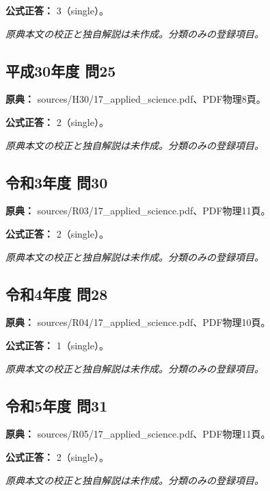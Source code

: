 \textbf{公式正答：} 3（single）。

\par\textit{原典本文の校正と独自解説は未作成。分類のみの登録項目。}

\subsection{平成30年度 問25}
\label{q:h30-reg-applied-25}

\noindent\textbf{原典：} sources/H30/17\_applied\_science.pdf、PDF物理8頁。

\textbf{公式正答：} 2（single）。

\par\textit{原典本文の校正と独自解説は未作成。分類のみの登録項目。}

\subsection{令和3年度 問30}
\label{q:r03-reg-applied-30}

\noindent\textbf{原典：} sources/R03/17\_applied\_science.pdf、PDF物理11頁。

\textbf{公式正答：} 2（single）。

\par\textit{原典本文の校正と独自解説は未作成。分類のみの登録項目。}

\subsection{令和4年度 問28}
\label{q:r04-reg-applied-28}

\noindent\textbf{原典：} sources/R04/17\_applied\_science.pdf、PDF物理10頁。

\textbf{公式正答：} 1（single）。

\par\textit{原典本文の校正と独自解説は未作成。分類のみの登録項目。}

\subsection{令和5年度 問31}
\label{q:r05-reg-applied-31}

\noindent\textbf{原典：} sources/R05/17\_applied\_science.pdf、PDF物理11頁。

\textbf{公式正答：} 2（single）。

\par\textit{原典本文の校正と独自解説は未作成。分類のみの登録項目。}

